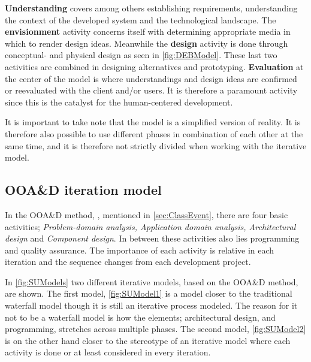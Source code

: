 \textbf{Understanding} covers among others establishing requirements, understanding the context of the developed system and the technological landscape.
The \textbf{envisionment} activity concerns itself with determining appropriate media in which to render design ideas.
Meanwhile the \textbf{design} activity is done through conceptual- and physical design as seen in \cref{fig:DEBModel}.
These last two activities are combined in designing alternatives and prototyping.
\textbf{Evaluation} at the center of the model is where understandings and design ideas are confirmed or reevaluated with the client and/or users.
It is therefore a paramount activity since this is the catalyst for the human-centered development.

It is important to take note that
the model is a simplified version of reality.
It is therefore also possible to use different phases in combination of each other at the same time, and it is therefore not strictly divided when working with the iterative model.

\subsection{OOA\&D iteration model}\label{sec:Iterative3}
In the OOA\&D method, \cite{Rod-Aalborg}, mentioned in \cref{sec:ClassEvent},  there are four basic activities; \textit{Problem-domain analysis, Application domain analysis, Architectural design} and \textit{Component design}.
In between these activities  also lies programming and quality assurance.
The importance of each activity is relative in each iteration and the sequence changes from each development project.


In \cref{fig:SUModels} two different iterative models, based on the OOA\&D method, are shown.
The first model, \cref{fig:SUModel1} is a model closer to the traditional waterfall model though it is still an iterative process modeled.
The reason for it not to be a waterfall model is how the elements; architectural design, and programming, stretches across multiple phases.
The second model, \cref{fig:SUModel2} is on the other hand closer to the stereotype of an iterative model where each activity is done or at least considered in every iteration. 

